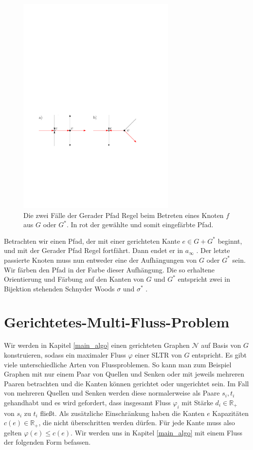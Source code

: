 \begin{figure}
	\centering
	\includegraphics[width=0.7\textwidth]{straight_path.pdf}
  \caption{Die zwei Fälle der Gerader Pfad Regel beim Betreten eines Knoten $f$ aus $G$ oder $G^*$. In rot der gewählte und somit eingefärbte Pfad.}
  \label{straight_path}
\end{figure}

Betrachten wir einen Pfad, der mit einer gerichteten Kante $e \in G+G^*$ beginnt, und mit der Gerader Pfad Regel fortfährt. Dann endet er in $a_\infty$ \cite[Lemma 15]{felsner01}. Der letzte passierte Knoten muss nun entweder eine der Aufhängungen von $G$ oder $G^*$ sein. Wir färben den Pfad in der Farbe dieser Aufhängung. Die so erhaltene Orientierung und Färbung auf den Kanten von $G$ und $G^*$ entspricht zwei in Bijektion stehenden Schnyder Woods $\sigma$ und $\sigma^*$ \cite{felsner04}.

\section{Gerichtetes-Multi-Fluss-Problem}\label{dir_multi_flow}

Wir werden in Kapitel \ref{main_algo} einen gerichteten Graphen $\mathcal{N}$ auf Basis von $G$ konstruieren, sodass ein maximaler Fluss $\varphi$ einer SLTR von $G$ entspricht. Es gibt viele unterschiedliche Arten von Flussproblemen. So kann man zum Beispiel Graphen mit nur einem Paar von Quellen und Senken oder mit jeweils mehreren Paaren betrachten und die Kanten können gerichtet oder ungerichtet sein. Im Fall von mehreren Quellen und Senken werden diese normalerweise als Paare $s_i,t_i$ gehandhabt und es wird gefordert, dass insgesamt Fluss $\varphi_i$ mit Stärke $d_i \in \mathbb{R}_+$ von $s_i$ zu $t_i$ fließt. Als zusätzliche Einschränkung haben die Kanten $e$ Kapazitäten $c(e) \in \mathbb{R}_+$, die nicht überschritten werden dürfen. Für jede Kante muss also gelten $\varphi(e) \leq c(e)$. Wir werden uns in Kapitel \ref{main_algo} mit einem Fluss der folgenden Form befassen.

